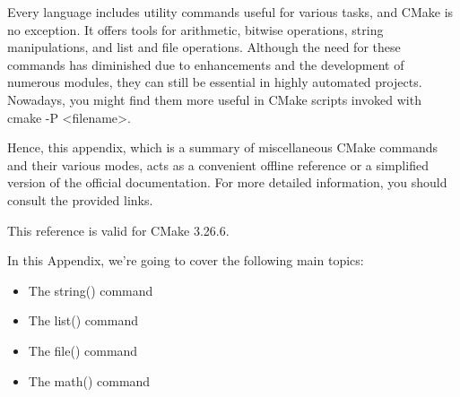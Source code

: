 
Every language includes utility commands useful for various tasks, and CMake is no exception. It offers tools for arithmetic, bitwise operations, string manipulations, and list and file operations. Although the need for these commands has diminished due to enhancements and the development of numerous modules, they can still be essential in highly automated projects. Nowadays, you might find them more useful in CMake scripts invoked with cmake -P <filename>.

Hence, this appendix, which is a summary of miscellaneous CMake commands and their various modes, acts as a convenient offline reference or a simplified version of the official documentation. For more detailed information, you should consult the provided links.

This reference is valid for CMake 3.26.6.

In this Appendix, we’re going to cover the following main topics:

\begin{itemize}
\item
The string() command

\item
The list() command

\item
The file() command

\item
The math() command
\end{itemize}




















